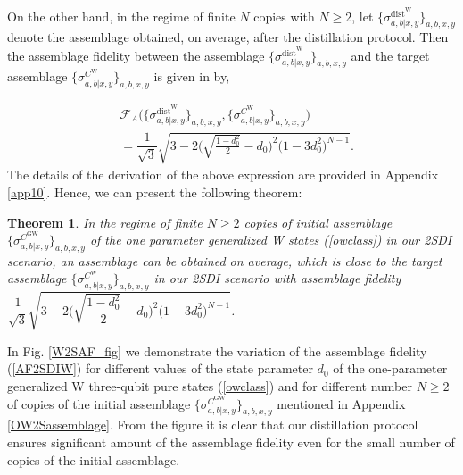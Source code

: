 \documentclass[reprint,superscriptaddress,nofootinbib,amsmath,amssymb,aps,pra,longbibliography]{revtex4-1}
\newtheorem{thm}{Theorem}
\begin{document}
On the other hand, in the regime of finite $N$ copies with $N \geq 2$, let $\{\sigma_{a,b|x,y}^{\text{dist}^{\text{W}}}\}_{a,b,x,y}$ denote the assemblage obtained, on average, after the distillation protocol. Then the assemblage fidelity between the assemblage $\{\sigma_{a,b|x,y}^{\text{dist}^{\text{W}}}\}_{a,b,x,y}$ and the target assemblage $\{\sigma_{a,b|x,y}^{C^{\text{W}}}\}_{a,b,x,y}$ is given in by,

\begin{align}
    &\mathcal{F}_A \Big(\{\sigma_{a,b|x,y}^{\text{dist}^{\text{W}}}\}_{a,b,x,y}, \{\sigma_{a,b|x,y}^{C^{\text{W}}}\}_{a,b,x,y} \Big)  \nonumber \\
    &=\dfrac{1}{\sqrt{3}}\sqrt{3 - 2 \Bigg(\sqrt{\frac{1-d_0^2}{2}} - d_0 \Bigg)^2 \Big( 1-3d_0^2 \Big)^{N-1}}.
    \label{AF2SDIW}
\end{align}
The details of the derivation of the above expression are provided in Appendix \ref{app10}. Hence, we can present the following theorem:
\begin{thm} 
In the regime of finite $N \geq 2$ copies of initial assemblage $\{\sigma_{a,b|x, y}^{C^{\text{GW}}}\}_{a,b,x,y}$ of the one parameter generalized W states (\ref{owclass}) in our 2SDI scenario, an assemblage can be obtained on average, which is close to the target assemblage $\{\sigma_{a,b|x, y}^{C^{\text{W}}}\}_{a,b,x,y}$ in our 2SDI scenario  with assemblage fidelity $\dfrac{1}{\sqrt{3}}\sqrt{3 - 2 \Bigg(\sqrt{\dfrac{1-d_0^2}{2}} - d_0 \Bigg)^2 \Big( 1-3d_0^2 \Big)^{N-1}}$.        
\end{thm}

In Fig. \ref{W2SAF_fig} we demonstrate the variation of the assemblage fidelity (\ref{AF2SDIW}) for different values of the state parameter $d_0$ of the one-parameter generalized W three-qubit pure states (\ref{owclass}) and for different number $N \geq 2$ of copies of the initial assemblage $\{\sigma_{a,b|x,y}^{C^{\text{GW}}}\}_{a,b,x,y}$ mentioned in Appendix \ref{OW2Sassemblage}. From the figure it is clear that our distillation protocol ensures significant amount of the assemblage fidelity even for the small number of copies of the initial assemblage.
\end{document}
